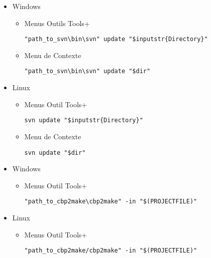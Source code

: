 
\begin{itemize}
\item Windows
\begin{itemize}
\item Menus Outils Tools+
\begin{verbatim}
"path_to_svn\bin\svn" update "$inputstr{Directory}"
\end{verbatim}
\item Menu de Contexte
\begin{verbatim}
"path_to_svn\bin\svn" update "$dir"
\end{verbatim}
\end{itemize}

\item Linux
\begin{itemize}
\item Menus Outil Tools+
\begin{verbatim}
svn update "$inputstr{Directory}"
\end{verbatim}
\item Menu de Contexte
\begin{verbatim}
svn update "$dir"
\end{verbatim}
\end{itemize}
\end{itemize}


\label{sec:tool_cbp2make}

\begin{itemize}
\item Windows
\begin{itemize}
\item Menus Outil Tools+
\begin{verbatim}
"path_to_cbp2make\cbp2make" -in "$(PROJECTFILE)"
\end{verbatim}
\end{itemize}

\item Linux
\begin{itemize}
\item Menus Outil Tools+
\begin{verbatim}
"path_to_cbp2make/cbp2make" -in "$(PROJECTFILE)"
\end{verbatim}
\end{itemize}
\end{itemize}

